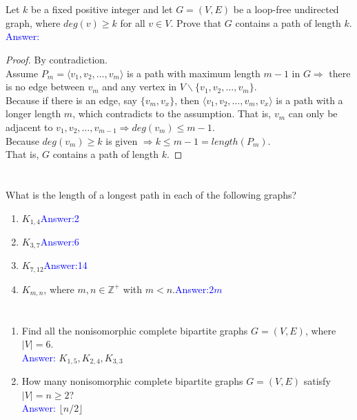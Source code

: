 \documentclass[a4paper]{article}
\begin{document}
\section{}
Let $k$ be a fixed positive integer and let $G=(V,E)$ be a loop-free undirected graph, where $deg(v)\geq k$ for all $v\in V$. Prove that $G$ contains a path of length $k$.\\
    \textcolor{blue}{Answer:}
    \begin{proof} By contradiction.\\
    Assume $P_m=\langle v_1,v_2,\ldots, v_m\rangle$ is a path with maximum length $m-1$ in $G\Rightarrow$ there is no edge between $v_m$ and any vertex in $V\backslash \{v_1,v_2,\ldots, v_m\}$.\\
    Because if there is an edge, say $\{v_m, v_x\}$, then $\langle v_1,v_2,\ldots, v_m, v_x\rangle$ is a path with a longer length $m$, which contradicts to the assumption. That is, $v_m$ can only be adjacent to $v_1,v_2,\ldots,v_{m-1}\Rightarrow deg(v_m)\leq m-1$.\\
    Because $deg(v_m)\geq k$ is given $\Rightarrow k\leq m-1=length(P_m)$.\\
    That is, $G$ contains a path of length $k$.
    \end{proof}
    
\section{}
What is the length of a longest path in each of the following graphs?
\begin{enumerate}[label=\alph*)]
    \item $K_{1,4}$\hspace{2em}\textcolor{blue}{Answer:2}
    \item $K_{3,7}$\hspace{2em}\textcolor{blue}{Answer:6}
    \item $K_{7,12}$\hspace{2em}\textcolor{blue}{Answer:14}
    \item $K_{m,n}$, where $m,n\in\mathbb{Z^+}$ with $m<n$.\hspace{2em}\textcolor{blue}{Answer:$2m$}
\end{enumerate}

\section{}
\begin{enumerate}[label=\alph*)]
    \item Find all the nonisomorphic complete bipartite graphs $G=(V,E)$, where $|V|=6$.\\
        \textcolor{blue}{Answer:} $K_{1,5},K_{2,4},K_{3,3}$
    \item How many nonisomorphic complete bipartite graphs $G=(V,E)$ satisfy $|V|=n\geq2$?\\
        \textcolor{blue}{Answer:} $\lfloor n/2\rfloor$
\end{enumerate}
\end{document}

